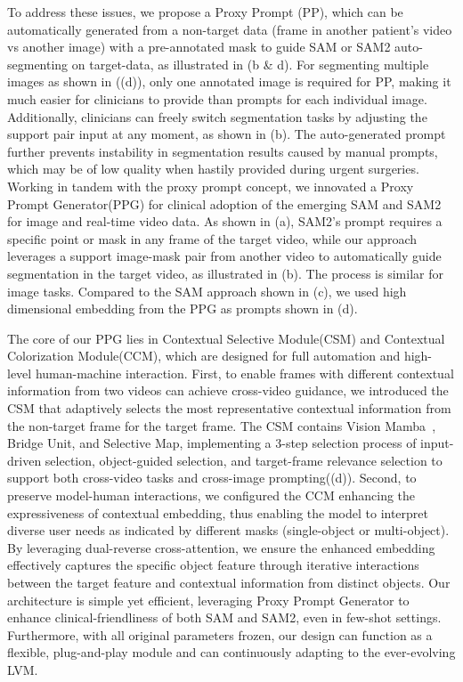 To address these issues, we propose a Proxy Prompt (PP), which can be automatically generated from a non-target data (frame in another patient’s video vs another image) with a pre-annotated mask to guide SAM or SAM2 auto-segmenting on target-data, as illustrated in (b \& d). For segmenting multiple images as shown in ((d)), only one annotated image is required for PP, making it much easier for clinicians to provide than prompts for each individual image. Additionally, clinicians can freely switch segmentation tasks by adjusting the support pair input at any moment, as shown in (b). The auto-generated prompt further prevents instability in segmentation results caused by manual prompts, which may be of low quality when hastily provided during urgent surgeries. Working in tandem with the proxy prompt concept, we innovated a Proxy Prompt Generator(PPG) for clinical adoption of the emerging SAM and SAM2 for image and real-time video data. As shown in (a), SAM2’s prompt requires a specific point or mask in any frame of the target video, while our approach leverages a support image-mask pair from another video to automatically guide segmentation in the target video, as illustrated in (b). The process is similar for image tasks. Compared to the SAM approach shown in (c), we used high dimensional embedding from the PPG as prompts shown in (d).

The core of our PPG lies in Contextual Selective Module(CSM) and Contextual Colorization Module(CCM), which are designed for full automation and high-level human-machine interaction. First, to enable frames with different contextual information from two videos can achieve cross-video guidance, we introduced the CSM that adaptively selects the most representative contextual information from the non-target frame for the target frame. The CSM contains Vision Mamba~\cite{zhu2024vision}, Bridge Unit, and Selective Map, implementing a 3-step selection process of input-driven selection, object-guided selection, and target-frame relevance selection to support both cross-video tasks and cross-image prompting((d)). Second, to preserve model-human interactions, we configured the CCM enhancing the expressiveness of contextual embedding, thus enabling the model to interpret diverse user needs as indicated by different masks (\eg single-object or multi-object). By leveraging dual-reverse cross-attention, we ensure the enhanced embedding effectively captures the specific object feature through iterative interactions between the target feature and contextual information from distinct objects. Our architecture is simple yet efficient, leveraging Proxy Prompt Generator to enhance clinical-friendliness of both SAM and SAM2, even in few-shot settings. Furthermore, with all original parameters frozen, our design can function as a flexible, plug-and-play module and can continuously adapting to the ever-evolving LVM.

